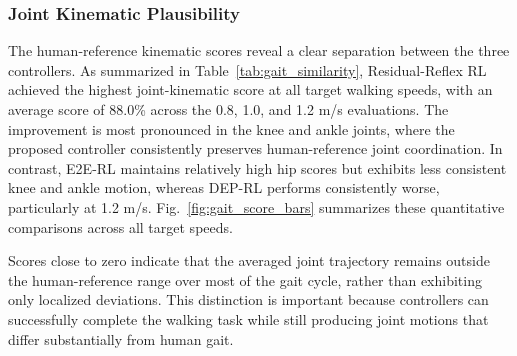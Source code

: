 \documentclass[manuscript,screen,review,anonymous]{acmart}
\begin{document}
\subsubsection{Joint Kinematic Plausibility}
The human-reference kinematic scores reveal a clear separation between the three controllers. As summarized in Table~\ref{tab:gait_similarity}, Residual-Reflex RL achieved the highest joint-kinematic score at all target walking speeds, with an average score of 88.0\% across the 0.8, 1.0, and 1.2 m/s evaluations. The improvement is most pronounced in the knee and ankle joints, where the proposed controller consistently preserves human-reference joint coordination. In contrast, E2E-RL maintains relatively high hip scores but exhibits less consistent knee and ankle motion, whereas DEP-RL performs consistently worse, particularly at 1.2 m/s. Fig.~\ref{fig:gait_score_bars} summarizes these quantitative comparisons across all target speeds.

Scores close to zero indicate that the averaged joint trajectory remains outside the human-reference range over most of the gait cycle, rather than exhibiting only localized deviations. This distinction is important because controllers can successfully complete the walking task while still producing joint motions that differ substantially from human gait.
\end{document}
